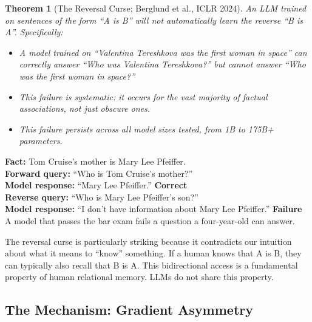 \documentclass[11pt, a4paper]{article}
\theoremstyle{definition}
\theoremstyle{plain}
\newtheorem{theorem}{Theorem}[section]
\begin{document}
\begin{theorem}[The Reversal Curse; Berglund et al., ICLR 2024]
\label{thm:reversal}
An LLM trained on sentences of the form ``\textnormal{A is B}'' will
\emph{not} automatically learn the reverse ``\textnormal{B is A}''.
Specifically:
\begin{itemize}[leftmargin=2em]
  \item A model trained on ``\textnormal{Valentina Tereshkova was the first
    woman in space}'' can correctly answer ``\textnormal{Who was Valentina
    Tereshkova?}'' but \emph{cannot} answer ``\textnormal{Who was the first
    woman in space?}''
  \item This failure is \emph{systematic}: it occurs for the vast majority
    of factual associations, not just obscure ones.
  \item This failure \emph{persists across all model sizes tested},
    from 1B to 175B+ parameters.
\end{itemize}
\end{theorem}

\begin{examplebox}[title={The Tom Cruise Test}]
\textbf{Fact:} Tom Cruise's mother is Mary Lee Pfeiffer.\\[4pt]
\textbf{Forward query:} ``Who is Tom Cruise's mother?''\\
\textbf{Model response:} ``Mary Lee Pfeiffer.'' \hfill\textcolor{anthgreen}{\textbf{Correct}}\\[4pt]
\textbf{Reverse query:} ``Who is Mary Lee Pfeiffer's son?''\\
\textbf{Model response:} ``I don't have information about Mary Lee Pfeiffer.'' \hfill\textcolor{anthorange}{\textbf{Failure}}\\[6pt]
A model that passes the bar exam fails a question a four-year-old can
answer.
\end{examplebox}

The reversal curse is particularly striking because it contradicts our
intuition about what it means to ``know'' something.  If a human knows
that A is B, they can typically also recall that B is A.  This
bidirectional access is a fundamental property of human relational memory.
LLMs do not share this property.

\subsection{The Mechanism: Gradient Asymmetry}
\label{sec:reversal_mechanism}
\end{document}
